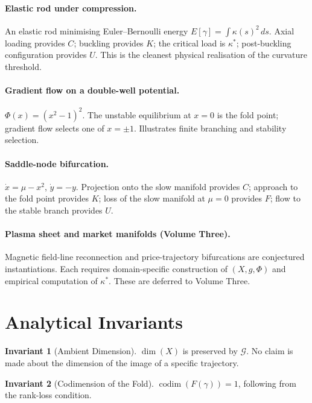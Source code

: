 \documentclass[12pt, oneside]{book}
\theoremstyle{plain}
\theoremstyle{definition}
\newtheorem{invariant}{Invariant}[section]
\theoremstyle{remark}
\begin{document}
\paragraph{Elastic rod under compression.}
An elastic rod minimising Euler--Bernoulli energy
$E[\gamma] = \int \kappa(s)^2\,ds$. Axial loading provides $C$;
buckling provides $K$; the critical load is $\kappa^*$; post-buckling
configuration provides $U$. This is the cleanest physical realisation
of the curvature threshold.

\paragraph{Gradient flow on a double-well potential.}
$\Phi(x) = (x^2 - 1)^2$. The unstable equilibrium at $x = 0$ is the
fold point; gradient flow selects one of $x = \pm 1$. Illustrates
finite branching and stability selection.

\paragraph{Saddle-node bifurcation.}
$\dot x = \mu - x^2$, $\dot y = -y$. Projection onto the slow
manifold provides $C$; approach to the fold point provides $K$; loss
of the slow manifold at $\mu = 0$ provides $F$; flow to the stable
branch provides $U$.

\paragraph{Plasma sheet and market manifolds (Volume Three).}
Magnetic field-line reconnection and price-trajectory bifurcations are
conjectured instantiations. Each requires domain-specific construction
of $(X, g, \Phi)$ and empirical computation of $\kappa^*$. These are
deferred to Volume Three.

\section{Analytical Invariants}

\begin{invariant}[Ambient Dimension]
$\dim(X)$ is preserved by $\mathcal{G}$. No claim is made about the
dimension of the image of a specific trajectory.
\end{invariant}

\begin{invariant}[Codimension of the Fold]
$\operatorname{codim}(F(\gamma)) = 1$, following from the rank-loss
condition.
\end{invariant}
\end{document}
